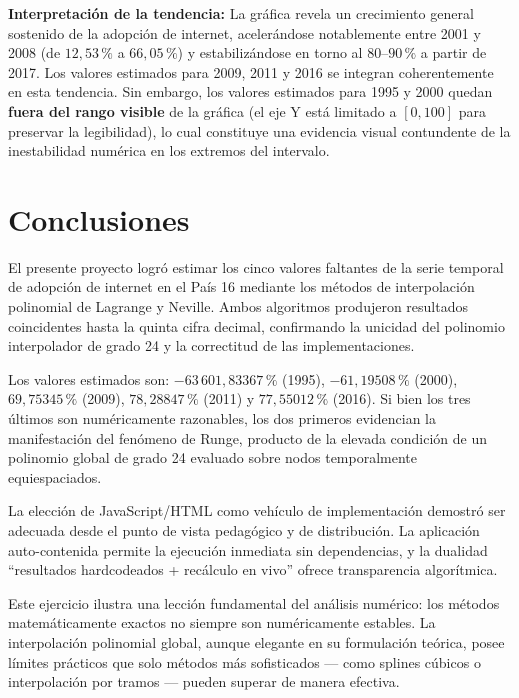 \documentclass[12pt, letterpaper]{article}
\begin{document}
\textbf{Interpretación de la tendencia:} La gráfica revela un crecimiento general sostenido de la adopción de internet, acelerándose notablemente entre 2001 y 2008 (de $12{,}53\,\%$ a $66{,}05\,\%$) y estabilizándose en torno al $80$--$90\,\%$ a partir de 2017. Los valores estimados para 2009, 2011 y 2016 se integran coherentemente en esta tendencia. Sin embargo, los valores estimados para 1995 y 2000 quedan \textbf{fuera del rango visible} de la gráfica (el eje Y está limitado a $[0, 100]$ para preservar la legibilidad), lo cual constituye una evidencia visual contundente de la inestabilidad numérica en los extremos del intervalo.

\section{Conclusiones}\label{sec:conclusiones}

El presente proyecto logró estimar los cinco valores faltantes de la serie temporal de adopción de internet en el País 16 mediante los métodos de interpolación polinomial de Lagrange y Neville. Ambos algoritmos produjeron resultados coincidentes hasta la quinta cifra decimal, confirmando la unicidad del polinomio interpolador de grado 24 y la correctitud de las implementaciones.

Los valores estimados son: $-63\,601{,}83367\,\%$ (1995), $-61{,}19508\,\%$ (2000), $69{,}75345\,\%$ (2009), $78{,}28847\,\%$ (2011) y $77{,}55012\,\%$ (2016). Si bien los tres últimos son numéricamente razonables, los dos primeros evidencian la manifestación del fenómeno de Runge, producto de la elevada condición de un polinomio global de grado 24 evaluado sobre nodos temporalmente equiespaciados.

La elección de JavaScript/HTML como vehículo de implementación demostró ser adecuada desde el punto de vista pedagógico y de distribución. La aplicación auto-contenida permite la ejecución inmediata sin dependencias, y la dualidad ``resultados hardcodeados + recálculo en vivo'' ofrece transparencia algorítmica.

Este ejercicio ilustra una lección fundamental del análisis numérico: los métodos matemáticamente exactos no siempre son numéricamente estables. La interpolación polinomial global, aunque elegante en su formulación teórica, posee límites prácticos que solo métodos más sofisticados --- como splines cúbicos o interpolación por tramos --- pueden superar de manera efectiva.
\end{document}

